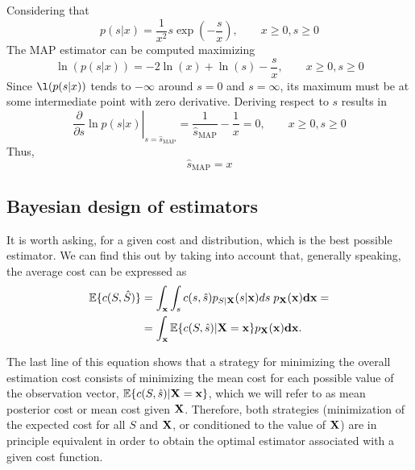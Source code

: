 \begin{example}[Estimation ML]
\end{example}\vspace{0.4cm}


{
\begin{example}
Considering that  
\begin{equation}
p(s|x) = \frac{1}{x^2} s \exp\left(-\frac{s}{x}\right), \qquad  x\ge 0, s \ge 0
\end{equation}
The MAP estimator can be computed maximizing
\begin{equation}
\ln(p(s|x)) = -2\ln(x) + \ln(s)-\frac{s}{x}, \qquad  x\ge 0, s \ge 0
\end{equation}
Since $\l(p(s|x))$ tends to $-\infty$ around $s=0 $ and $s=\infty$, its maximum must be at some intermediate point with zero derivative. Deriving respect to $s$ results in
\begin{equation}
\left.\frac{\partial}{\partial s} \ln p(s|x)\right|_{s=\hat{s}_\text{MAP}} = \frac{1}{\hat{s}_\text{MAP}} - \frac{1}{x} = 0, \qquad  x\ge 0, s \ge 0
\end{equation}
Thus,
\begin{equation}
\hat{s}_\text{MAP} = x
\end{equation}
\end{example}\vspace{0.4cm}}


\subsection{Bayesian design of estimators}

It is worth asking, for a given cost and distribution, which is the best possible estimator. We can find this out by taking into account that, generally speaking, the average cost can be expressed as
\begin{align}
\label{ec:coste_medio}
\mathbb{E}\{c(S,\hat S)\} 
& = \int_{\bf x} \int_s c(s,\hat s) p_{S|{\bf X}}(s|{\bf x}) ds\;p_{\bf X}(\bf x) d{\bf x} = \nonumber\\
& = \int_{\bf x} \mathbb{E}\{c(S,\hat s)|{\bf X} = {\bf x} \} p_{\bf X}(\bf x) d{\bf x}.
\end{align}

The last line of this equation shows that a strategy for minimizing the overall estimation cost consists of minimizing the mean cost for each possible value of the observation vector,  $\mathbb{E}\{c(S,\hat s)|{\bf X} = {\bf x} \}$, which we will refer to as mean posterior cost or mean cost given ${\bf X}$. Therefore, both strategies (minimization of the expected cost for all $S$ and $\bf X$, or conditioned to the value of $\bf X$) are in principle equivalent in order to obtain the optimal estimator associated with a given cost function.

